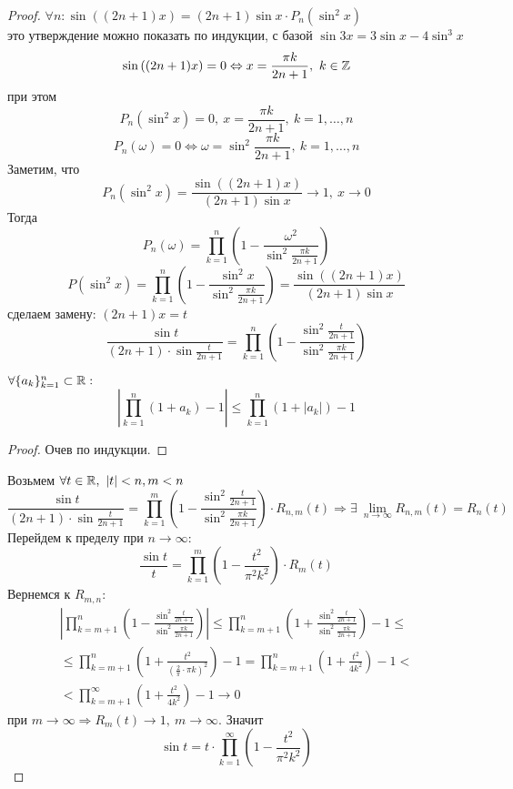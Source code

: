 \begin{proof}
    $\forall n: \sin((2n+1)x)=(2n+1)\sin{x}\cdot P_n(\sin^2{x})$\\
    это утверждение можно показать по индукции, с базой $\sin{3x}=3\sin{x}-4\sin^3{x}$\\
    \[\sin{((2n+1)x)}=0 \Leftrightarrow x=\frac{\pi k}{2n+1},\ k\in \mathbb{Z}\]
    при этом
    \[P_n(\sin^2{x})=0,\ x=\frac{\pi k}{2n+1},\ k=1,\dots,n\]
    \[P_n(\omega)=0 \Leftrightarrow \omega=\sin^2{\frac{\pi k}{2n+1}},\ k=1,\dots, n\]
    Заметим, что
    \[P_n(\sin^2{x})=\frac{\sin((2n+1)x)}{(2n+1)\sin{x}}\to 1,\ x\to 0\]
    Тогда
    \[P_n(\omega)=\prod\limits_{k=1}^{n}(1-\frac{\omega^2}{\sin^2{\frac{\pi k}{2n+1}}})\]
    \[P(\sin^2{x})=\prod\limits_{k=1}^{n}\left(1-\frac{\sin^2{x}}{\sin^2{\frac{\pi k}{2n+1}}}\right)=\frac{\sin((2n+1)x)}{(2n+1)\sin{x}}\]
    сделаем замену: $(2n+1)x=t$
    \[\frac{\sin{t}}{(2n+1)\cdot \sin{\frac{t}{2n+1}}}=\prod\limits_{k=1}^{n}\left(1-\frac{\sin^2{\frac{t}{2n+1}}}{\sin^2{\frac{\pi k}{2n+1}}}\right)\]
    \begin{lemma}
        $\forall \{a_k\}_{k=1}^n\subset \mathbb{R}:$
        \[\left|\prod\limits_{k=1}^{n}(1+a_k)-1\right|\leq \prod\limits_{k=1}^{n}(1+|a_k|)-1\]
    \end{lemma}
    \begin{proof}
        Очев по индукции.
    \end{proof}
    Возьмем $\forall t\in \mathbb{R},\ |t|<n, m<n$
    \[\frac{\sin{t}}{(2n+1)\cdot \sin{\frac{t}{2n+1}}}=\prod\limits_{k=1}^{m}\left(1-\frac{\sin^2\frac{t}{2n+1}}{\sin^2\frac{\pi k}{2n+1}}\right)\cdot R_{n,m}(t) \Rightarrow \exists\ \lim\limits_{n\to\infty}R_{n,m}(t)=R_n(t)\]
    Перейдем к пределу при $n\to \infty$:
    \[\frac{\sin{t}}{t}=\prod\limits_{k=1}^{m}\left(1-\frac{t^2}{\pi^2 k^2}\right)\cdot R_m(t)\]
    Вернемся к $R_{m,n}$:
    \begin{multline*}
        \left|\prod\limits_{k=m+1}^{n}\left(1-\frac{\sin^2\frac{t}{2n+1}}{\sin^2\frac{\pi k}{2n+1}}\right)\right|\leq \prod\limits_{k=m+1}^{n}\left(1+\frac{\sin^2\frac{t}{2n+1}}{\sin^2\frac{\pi k}{2n+1}}\right)-1\leq\\
        \leq \prod\limits_{k=m+1}^{n}\left(1+\frac{t^2}{(\frac{2}{\pi}\cdot \pi k)^2}\right)-1=\prod\limits_{k=m+1}^{n}\left(1+\frac{t^2}{4k^2}\right)-1<\\
        <\prod\limits_{k=m+1}^{\infty}\left(1+\frac{t^2}{4k^2}\right)-1\to 0
    \end{multline*}
    при $m\to \infty \Rightarrow R_m(t)\to 1,\ m\to \infty$. Значит
    \[\sin{t}=t\cdot \prod\limits_{k=1}^{\infty}\left(1-\frac{t^2}{\pi^2 k^2}\right)\]
\end{proof}